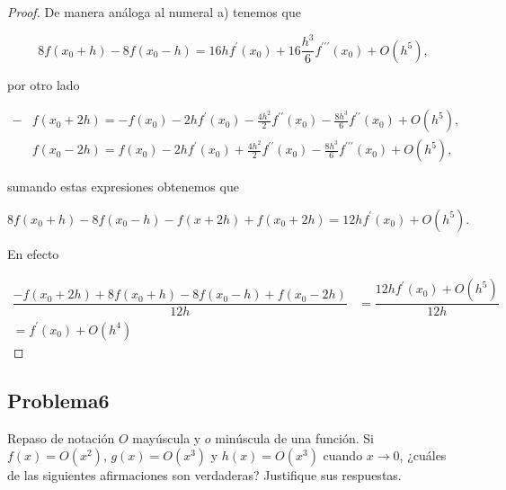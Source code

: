 \documentclass[12pt, a4paper]{article}%
\begin{document}
\begin{proof}
    De manera análoga al numeral a) tenemos que
    
$$
8f\left(x_0+h\right)-8f\left(x_0-h\right)=16 h f^{\prime}\left(x_0\right)+16\frac{h^3}{6} f^{\prime \prime \prime}\left(x_0\right)+O(h^5),
$$

por otro lado

$$\begin{aligned}
 -&f(x_0+2 h)=-f\left(x_0\right)-2h f^{\prime}\left(x_0\right)-\frac{4 h^2}{2} f^{\prime \prime}\left(x_0\right)-\frac{8 h^3}{6} f^{\prime \prime}\left(x_0\right)+O\left(h^5\right),\\
& f(x_0-2 h)=f\left(x_0\right)-2 h f^{\prime}\left(x_0\right)+\frac{4 h^2}{2}f^{\prime\prime}(x_0)-\frac{8 h^3}{6} f^{\prime \prime \prime}\left(x_0\right)+O\left(h^5\right),
\end{aligned}
$$

sumando estas expresiones obtenemos que 

$$8f\left(x_0+h\right)-8f\left(x_0-h\right)-f(x+2h)+f(x_0+2h)=12hf^{\prime}(x_0)+O(h^5).$$

En efecto 

\begin{align*}
     \dfrac{-f(x_0 + 2h) + 8f(x_0 + h) - 8f(x_0 - h) + f(x_0 - 2h)}{12h}&=\dfrac{12hf^{\prime}(x_0)+O(h^5)}{12h}\\
     =f^{\prime}(x_0)+O(h^4)
\end{align*}

\end{proof}
\subsection*{Problema6}
Repaso de notación \( O \) mayúscula y \( o \) minúscula de una función. Si \( f(x) = O(x^2) \), \( g(x) = O(x^3) \) y \( h(x) = O(x^3) \) cuando \( x \to 0 \), ¿cuáles de las siguientes afirmaciones son verdaderas? Justifique sus respuestas.
\end{document}
